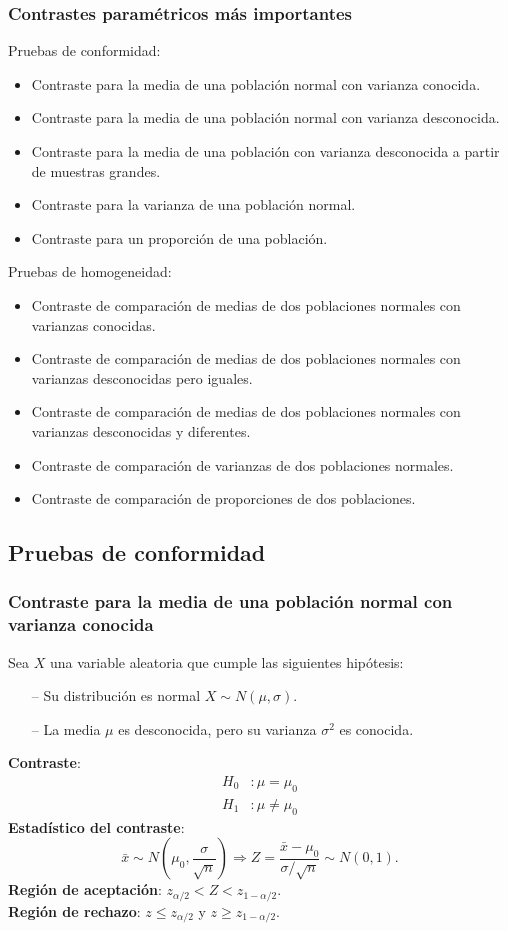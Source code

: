 \begin{frame}
\frametitle{Contrastes paramétricos más importantes}
Pruebas de conformidad:
\begin{itemize}
\item Contraste para la media de una población normal con varianza conocida.
\item Contraste para la media de una población normal con varianza desconocida.
\item Contraste para la media de una población con varianza desconocida a partir de muestras grandes.
\item Contraste para la varianza de una población normal.
\item Contraste para un proporción de una población.
\end{itemize}
Pruebas de homogeneidad:
\begin{itemize}
\item Contraste de comparación de medias de dos poblaciones normales con varianzas conocidas.
\item Contraste de comparación de medias de dos poblaciones normales con varianzas desconocidas pero iguales.
\item Contraste de comparación de medias de dos poblaciones normales con varianzas desconocidas y diferentes.
\item Contraste de comparación de varianzas de dos poblaciones normales.
\item Contraste de comparación de proporciones de dos poblaciones.
\end{itemize}
\end{frame}


\subsection{Pruebas de conformidad}
\begin{frame}
\frametitle{Contraste para la media de una población normal con varianza conocida}
Sea $X$ una variable aleatoria que cumple las siguientes hipótesis:
\begin{itemize}
\item[--] Su distribución es normal $X\sim N(\mu,\sigma)$.
\item[--] La media $\mu$ es desconocida, pero su varianza $\sigma^2$ es conocida.
\end{itemize}
\textbf{Contraste}:
\begin{align*}
H_0 &: \mu=\mu_0\\
H_1 &: \mu\neq \mu_0
\end{align*}
\textbf{Estadístico del contraste}:
\[
\bar x\sim N\left(\mu_0,\frac{\sigma}{\sqrt{n}}\right) \Rightarrow Z=\frac{\bar x-\mu_0}{\sigma/\sqrt{n}}\sim N(0,1).
\]
\textbf{Región de aceptación}: $z_{\alpha/2}< Z < z_{1-\alpha/2}$.\\
\textbf{Región de rechazo}: $z\leq z_{\alpha/2}$ y $z\geq z_{1-\alpha/2}$.
\end{frame}


